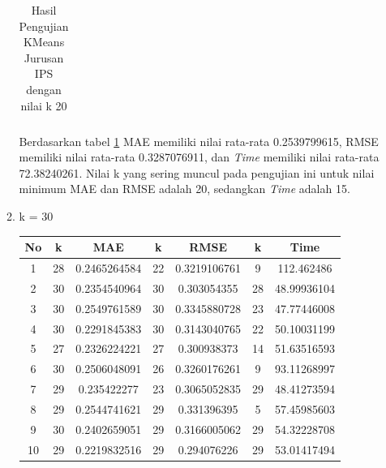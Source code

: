 \begin{enumerate}
\begin{enumerate}
\begin{longtable}[H]{|c|c|c|c|c|c|c|}
                        \caption{Hasil Pengujian KMeans Jurusan IPS dengan nilai k 20}
                        \label{tab:ips k = 20}
                    \end{longtable}
                \endgroup
                
                Berdasarkan tabel \ref{tab:ips k = 20} MAE memiliki nilai rata-rata 0.2539799615, RMSE memiliki nilai rata-rata 0.3287076911, dan \textit{Time} memiliki nilai rata-rata 72.38240261. Nilai k yang sering muncul pada pengujian ini untuk nilai minimum MAE dan RMSE adalah 20, sedangkan \textit{Time} adalah 15.
                
            \item k = 30 \\
                \begingroup
                \renewcommand\arraystretch{1.5} 
                    \begin{longtable}[H]{|c|c|c|c|c|c|c|}
                        \hline
                        No & k & MAE & k & RMSE & k & Time \\
                        \hline
                        1 & 28 & 0.2465264584 & 22 & 0.3219106761 & 9 & 112.462486\\
                        \hline
                        2 & 30 & 0.2354540964 & 30 & 0.303054355 & 28 & 48.99936104\\
                        \hline
                        3 & 30 & 0.2549761589 & 30 & 0.3345880728 & 23 & 47.77446008\\
                        \hline
                        4 & 30 & 0.2291845383 & 30 & 0.3143040765 & 22 & 50.10031199\\
                        \hline
                        5 & 27 & 0.2326224221 & 27 & 0.300938373 & 14 & 51.63516593\\
                        \hline
                        6 & 30 & 0.2506048091 & 26 & 0.3260176261 & 9 & 93.11268997\\
                        \hline
                        7 & 29 & 0.235422277 & 23 & 0.3065052835 & 29 & 48.41273594\\
                        \hline
                        8 & 29 & 0.2544741621 & 29 & 0.331396395 & 5 & 57.45985603\\
                        \hline
                        9 & 30 & 0.2402659051 & 29 & 0.3166005062 & 29 & 54.32228708\\
                        \hline
                        10 & 29 & 0.2219832516 & 29 & 0.294076226 & 29 & 53.01417494\\
                        \hline
                        

\end{longtable}
\end{enumerate}
\end{enumerate}
